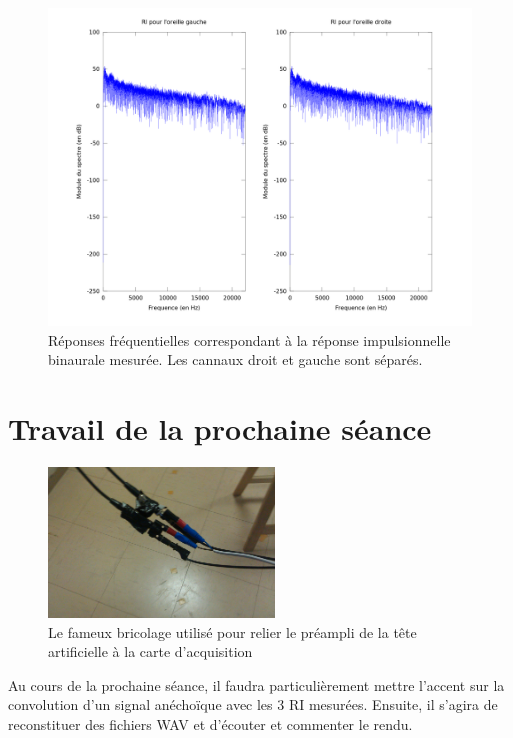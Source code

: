 \documentclass[12pt]{article}
\begin{document}
\begin{figure}[h]
    \vfill\begin{center}
        \includegraphics[scale=0.6]{ri_binaurale.png}
    \end{center}\vfill
    \caption{\label{spectre2} Réponses fréquentielles correspondant à la réponse impulsionnelle binaurale mesurée. Les
    cannaux droit et gauche sont séparés.}
\end{figure}

\section{Travail de la prochaine séance} %

\begin{figure}
    \hfill
    \begin{center}
        \includegraphics[width=6cm]{bidouille.jpg}
        \caption{\label{bidouille}Le fameux bricolage utilisé pour relier le préampli de la tête artificielle à la carte
        d'acquisition}
    \end{center}
    \hfill
\end{figure}
Au cours de la prochaine séance, il faudra particulièrement mettre l'accent sur la convolution d'un signal anéchoïque
avec les 3 RI mesurées. Ensuite, il s'agira de reconstituer des fichiers WAV et d'écouter et commenter le rendu.
\end{document}
